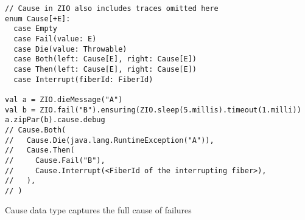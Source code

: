 \begin{algorithm}

\begin{verbatim}
// Cause in ZIO also includes traces omitted here
enum Cause[+E]:
  case Empty
  case Fail(value: E)
  case Die(value: Throwable)
  case Both(left: Cause[E], right: Cause[E])
  case Then(left: Cause[E], right: Cause[E])
  case Interrupt(fiberId: FiberId)

val a = ZIO.dieMessage("A")
val b = ZIO.fail("B").ensuring(ZIO.sleep(5.millis).timeout(1.milli))
a.zipPar(b).cause.debug
// Cause.Both(
//   Cause.Die(java.lang.RuntimeException("A")),
//   Cause.Then(
//     Cause.Fail("B"),
//     Cause.Interrupt(<FiberId of the interrupting fiber>),
//   ),
// )
\end{verbatim}

\caption{Cause data type captures the full cause of failures \label{zio:cause}}
\end{algorithm}